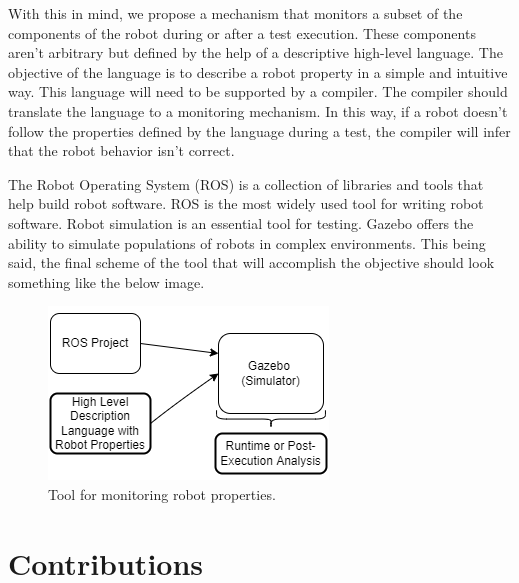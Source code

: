 

With this in mind, we propose a mechanism that monitors a subset of the components of the robot during or after a test execution.
These components aren't arbitrary but defined by the help of a descriptive high-level language.
The objective of the language is to describe a robot property in a simple and intuitive way.
This language will need to be supported by a compiler. 
The compiler should translate the language to a monitoring mechanism.
In this way, if a robot doesn't follow the properties defined by the language 
during a test, the compiler will infer that the robot behavior isn't correct. 

\par

The Robot Operating System (ROS) is a collection of libraries and tools that help 
build robot software. ROS is the most widely used tool for writing robot software.
Robot simulation is an essential tool for testing. Gazebo offers the ability 
to simulate populations of robots in complex environments.
This being said, the final scheme of the tool that will accomplish the objective 
should look something like the below image.

\begin{figure}[h!]
    \includegraphics{images/intro_diag.png}
    \caption{Tool for monitoring robot properties.}
    \label{fig:intro_objectives}
\end{figure}

\section{Contributions}
\label{sec:contributions}

